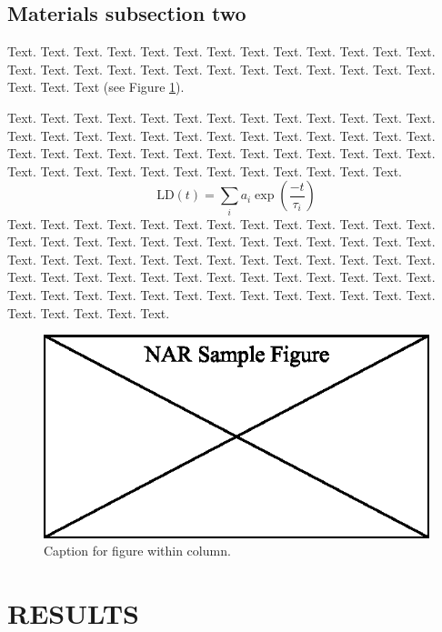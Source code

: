 \documentclass[a4,center,fleqn]{NAR}
\begin{document}
\subsection{Materials subsection two}

Text. Text. Text. Text. Text. Text. Text. Text. Text. Text. Text.
Text. Text. Text. Text. Text. Text. Text. Text. Text. Text. Text.
Text. Text. Text. Text. Text. Text. Text
(see Figure \ref{NAR-fig1}).

Text. Text. Text. Text. Text. Text. Text. Text. Text. Text. Text.
Text. Text. Text. Text. Text. Text. Text. Text. Text. Text. Text.
Text. Text. Text. Text. Text. Text. Text. Text. Text. Text. Text.
Text. Text. Text. Text. Text. Text. Text. Text. Text. Text. Text.
Text. Text. Text. Text. Text. Text. Text.
\begin{equation*}
\mathrm{LD} \left( t \right) =
\sum\limits_i
a_i \exp \left( \frac{-t}{\tau_i} \right)
\end{equation*}
Text. Text. Text. Text. Text. Text. Text. Text. Text. Text. Text.
Text. Text. Text. Text. Text. Text. Text. Text. Text. Text. Text.
Text. Text. Text. Text. Text. Text. Text. Text. Text. Text. Text.
Text. Text. Text. Text. Text. Text. Text. Text. Text. Text. Text.
Text. Text. Text. Text. Text. Text. Text. Text. Text. Text. Text.
Text. Text. Text. Text. Text. Text. Text. Text. Text. Text. Text.
Text. Text. Text. Text.

\begin{figure}[t]
\begin{center}
\includegraphics{NAR-fig1.eps}
\end{center}
\caption{Caption for figure within column.}
\label{NAR-fig1}
\end{figure}


\section{RESULTS}
\end{document}
